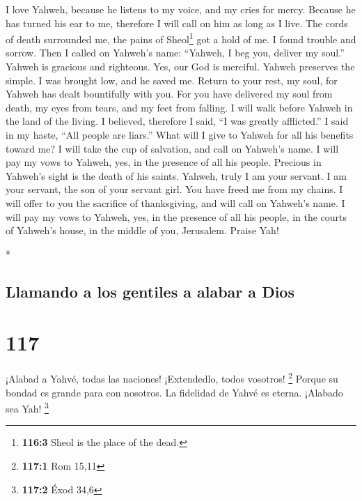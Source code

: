 \begin{paracol}{2}
\begin{otherlanguage}{english}
 I love Yahweh, because he listens to my voice, and my
cries for mercy.  Because he has turned his ear to me,
therefore I will call on him as long as I live.  The cords
of death surrounded me, the pains of Sheol\footnote{\textbf{116:3} Sheol
  is the place of the dead.} got a hold of me. I found trouble and
sorrow.  Then I called on Yahweh's name: ``Yahweh, I beg
you, deliver my soul.''  Yahweh is gracious and righteous.
Yes, our God is merciful.  Yahweh preserves the simple. I
was brought low, and he saved me.  Return to your rest, my
soul, for Yahweh has dealt bountifully with you.  For you
have delivered my soul from death, my eyes from tears, and my feet from
falling.  I will walk before Yahweh in the land of the
living.  I believed, therefore I said, ``I was greatly
afflicted.''  I said in my haste, ``All people are
liars.''  What will I give to Yahweh for all his benefits
toward me?  I will take the cup of salvation, and call on
Yahweh's name.  I will pay my vows to Yahweh, yes, in the
presence of all his people.  Precious in Yahweh's sight
is the death of his saints.  Yahweh, truly I am your
servant. I am your servant, the son of your servant girl. You have freed
me from my chains.  I will offer to you the sacrifice of
thanksgiving, and will call on Yahweh's name.  I will pay
my vows to Yahweh, yes, in the presence of all his people,
 in the courts of Yahweh's house, in the middle of you,
Jerusalem. Praise Yah!

\end{otherlanguage}

\switchcolumn[0]*

\hypertarget{llamando-a-los-gentiles-a-alabar-a-dios}{%
\subsection{Llamando a los gentiles a alabar a
Dios}\label{llamando-a-los-gentiles-a-alabar-a-dios}}

\hypertarget{section-232}{%
\section{117}\label{section-232}}

 ¡Alabad a Yahvé, todas las naciones! ¡Extendedlo, todos
vosotros! \footnote{\textbf{117:1} Rom 15,11}  Porque su
bondad es grande para con nosotros. La fidelidad de Yahvé es eterna.
¡Alabado sea Yah! \footnote{\textbf{117:2} Éxod 34,6}


\end{paracol}
